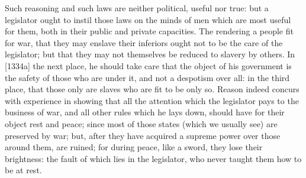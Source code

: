 Such reasoning and such laws are neither political, useful nor true: but a
legislator ought to instil those laws on the minds of men which are most
useful for them, both in their public and private capacities. The
rendering a people fit for war, that they may enslave their inferiors
ought not to be the care of the legislator; but that they may not
themselves be reduced to slavery by others. In [1334a] the next place, he
should take care that the object of his government is the safety of those
who are under it, and not a despotism over all: in the third place, that
those only are slaves who are fit to be only so. Reason indeed concurs
with experience in showing that all the attention which the legislator
pays to the business of war, and all other rules which he lays down,
should have for their object rest and peace; since most of those states
(which we usually see) are preserved by war; but, after they have acquired
a supreme power over those around them, are ruined; for during peace, like
a sword, they lose their brightness: the fault of which lies in the
legislator, who never taught them how to be at rest.


